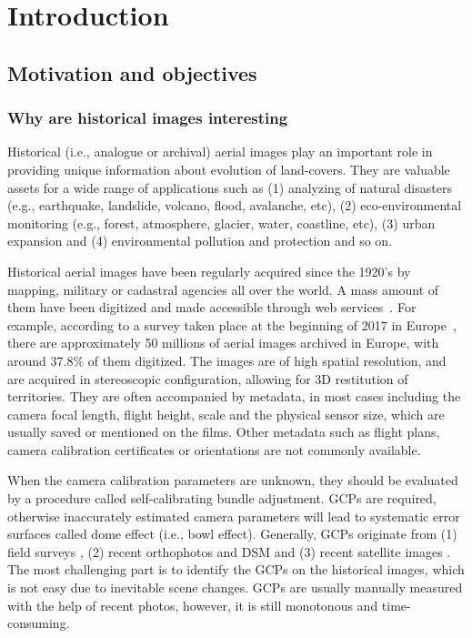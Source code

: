 
\chapter{Introduction}
\label{chap:intro}
\minitoc

\section{Motivation and objectives}
\subsection{Why are historical images interesting}
Historical (i.e., analogue or archival) aerial images play an important role in providing unique information about evolution of land-covers. 
They are valuable assets for a wide range of applications such as (1) analyzing of natural disasters (e.g., earthquake, landslide, volcano, flood, avalanche, etc), (2) eco-environmental monitoring (e.g., forest, atmosphere, glacier, water, coastline, etc), (3) urban expansion and (4) environmental pollution and protection and so on.
\par
Historical aerial images have been regularly acquired since the 1920’s by mapping, military or cadastral agencies all over the world. A mass amount of them have been digitized and made accessible through web services~\cite{sebastien2019archiving,earthexplorer,remonterletemps}. 
For example, according to a survey taken place at the beginning of 2017 in Europe~\cite{sebastien2019archiving}, there are approximately 50 millions of aerial images archived in Europe, with around 37.8\% of them digitized. 
The images are of high spatial resolution, and are acquired in stereoscopic configuration, allowing for 3D restitution of territories. 
They are often accompanied by metadata, in most cases including the camera focal length, flight height, scale and the physical sensor size, which are usually saved or mentioned on the films. Other metadata such as flight plans, camera calibration certificates or orientations are not commonly available. 
\par
When the camera calibration parameters are unknown, they should be evaluated by a procedure called self-calibrating bundle adjustment. \ac{GCP}s are required, otherwise inaccurately estimated camera parameters will lead to systematic error surfaces called dome effect (i.e., bowl effect).
Generally, \ac{GCP}s originate from (1) field surveys \cite{micheletti2015application,walstra2004time,cardenal2006use}, (2) recent orthophotos and \ac{DSM} \cite{nurminen2015automation,ellis2006measuring,fox2008unlocking} and (3) recent satellite images \cite{ellis2006measuring,ford2013shoreline}. The most challenging part is to identify the \ac{GCP}s on the historical images, which is not easy due to inevitable scene changes. \ac{GCP}s are usually manually measured with the help of recent photos, however, it is still monotonous and time-consuming. 
